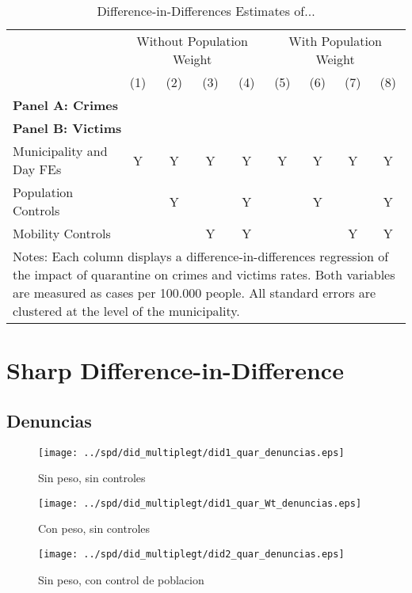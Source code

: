 \documentclass[11pt,letterpaper]{article}
\begin{document}
\begin{landscape}
  \begin{table}
    \centering
    \caption{Difference-in-Differences Estimates of...}\label{tab:DD}
    \begin{tabular}{lcccccccc}\toprule
      &\multicolumn{4}{c}{Without Population Weight}&\multicolumn{4}{c}{With Population Weight} \\ \cmidrule(r){2-5}\cmidrule(r){6-9}
      &(1)&(2)&(3)&(4)&(5)&(6)&(7)&(8) \\ \midrule
      \multicolumn{9}{l}{\textbf{Panel A: Crimes}}\\
       \midrule
      \multicolumn{9}{l}{\textbf{Panel B: Victims}}\\
      
      \midrule
      Municipality and Day FEs &Y&Y&Y&Y&Y&Y&Y&Y \\
      Population Controls      & &Y& &Y& &Y& &Y \\
      Mobility Controls        & & &Y&Y& & &Y&Y \\
      \bottomrule
      \multicolumn{9}{p{21.8cm}}{{\footnotesize Notes: Each column displays a difference-in-differences regression of the impact of quarantine on crimes and victims rates. Both variables are measured as cases per 100.000 people.  All standard errors are clustered at the level of the municipality.}}
    \end{tabular}
  \end{table}
\end{landscape}

\section{Sharp Difference-in-Difference}
	\subsection{Denuncias}
\begin{figure}[hbtp]
\caption{Sin peso, sin controles}
\centering
\texttt{[image: ../spd/did\_multiplegt/did1\_quar\_denuncias.eps]}
\end{figure}

\begin{figure}[hbtp]
\caption{Con peso, sin controles}
\centering
\texttt{[image: ../spd/did\_multiplegt/did1\_quar\_Wt\_denuncias.eps]}
\end{figure}
\begin{figure}[hbtp]
\caption{Sin peso, con control de poblacion}
\centering
\texttt{[image: ../spd/did\_multiplegt/did2\_quar\_denuncias.eps]}
\end{figure}
\end{document}
